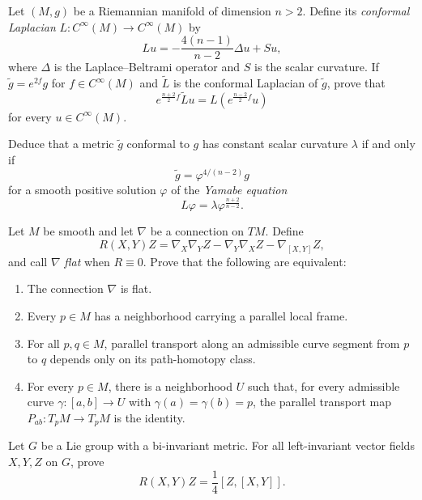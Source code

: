 \begin{exercise}
\label{prob:conformal-laplacian-yamabe}
Let $(M,g)$ be a Riemannian manifold of dimension $n>2$. Define its
\emph{conformal Laplacian} $L\colon C^\infty(M)\to C^\infty(M)$ by
\[
Lu=-\frac{4(n-1)}{n-2}\Delta u+Su,
\]
where $\Delta$ is the Laplace--Beltrami operator and $S$ is the scalar
curvature. If $\widetilde g=e^{2f}g$ for $f\in C^\infty(M)$ and
$\widetilde L$ is the conformal Laplacian of $\widetilde g$, prove that
\[
e^{\frac{n+2}{2}f}\widetilde Lu
=L\left(e^{\frac{n-2}{2}f}u\right)
\]
for every $u\in C^\infty(M)$.

Deduce that a metric $\widetilde g$ conformal to $g$ has constant scalar
curvature $\lambda$ if and only if
\[
\widetilde g=\varphi^{4/(n-2)}g
\]
for a smooth positive solution $\varphi$ of the \emph{Yamabe equation}
\begin{equation}
L\varphi=\lambda\varphi^{\frac{n+2}{n-2}}. \tag{7.59}
\end{equation}
\end{exercise}

\begin{exercise}
\label{prob:flat-connection}
Let $M$ be smooth and let $\nabla$ be a connection on $TM$. Define
\[
R(X,Y)Z
=\nabla_X\nabla_YZ-\nabla_Y\nabla_XZ-\nabla_{[X,Y]}Z,
\]
and call $\nabla$ \emph{flat} when $R\equiv0$. Prove that the following are
equivalent:
\begin{enumerate}
\item[(a)] The connection $\nabla$ is flat.
\item[(b)] Every $p\in M$ has a neighborhood carrying a parallel local frame.
\item[(c)] For all $p,q\in M$, parallel transport along an admissible curve
segment from $p$ to $q$ depends only on its path-homotopy class.
\item[(d)] For every $p\in M$, there is a neighborhood $U$ such that, for
every admissible curve $\gamma\colon[a,b]\to U$ with
$\gamma(a)=\gamma(b)=p$, the parallel transport map
$P_{ab}\colon T_pM\to T_pM$ is the identity.
\end{enumerate}
\end{exercise}

\begin{exercise}
\label{prob:lie-group-curvature}
Let $G$ be a Lie group with a bi-invariant metric. For all left-invariant
vector fields $X,Y,Z$ on $G$, prove
\[
R(X,Y)Z=\frac14[Z,[X,Y]].
\]
\end{exercise}

